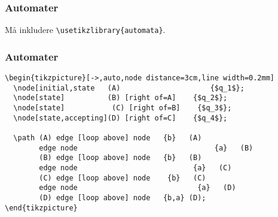 \documentclass{beamer}
\begin{document}
\begin{frame}[fragile]
\frametitle{Automater}


\begin{center}
\end{center}

Må inkludere \texttt{\textbackslash usetikzlibrary\{automata\}}.

\end{frame}

\begin{frame}[fragile]
\frametitle{Automater}


\begin{Verbatim}[fontsize=\footnotesize, frame=single]
\begin{tikzpicture}[->,auto,node distance=3cm,line width=0.2mm]
  \node[initial,state   (A) 	          	    {$q_1$};
  \node[state]          (B) [right of=A]    {$q_2$};
  \node[state]	         (C) [right of=B]    {$q_3$};
  \node[state,accepting](D) [right of=C]    {$q_4$};

  \path (A) edge [loop above] node 	 {b}   (A)
	    edge node      			                 {a}   (B)
        (B) edge [loop above] node 	 {b}   (B)
	    edge node   	                    {a}   (C)
        (C) edge [loop above] node	  {b}   (C)
	    edge node 	    	                 {a}   (D)
        (D) edge [loop above] node 	 {b,a} (D);
\end{tikzpicture}
\end{Verbatim}

\end{frame}
\end{document}

